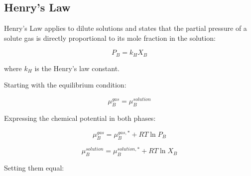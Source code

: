 \documentclass{article}
\theoremstyle{definition}
\begin{document}
\begin{center}
\end{center}

\subsection{Henry's Law}

Henry's Law applies to dilute solutions and states that the partial pressure of a solute gas is directly proportional to its mole fraction in the solution:

\begin{equation}
P_B = k_H X_B
\end{equation}

where $k_H$ is the Henry’s law constant.

Starting with the equilibrium condition:

\begin{equation}
\mu_B^{gas} = \mu_B^{solution}
\end{equation}

Expressing the chemical potential in both phases:

\begin{equation}
\mu_B^{gas} = \mu_B^{gas,*} + RT \ln P_B
\end{equation}

\begin{equation}
\mu_B^{solution} = \mu_B^{solution,*} + RT \ln X_B
\end{equation}

Setting them equal:
\end{document}
